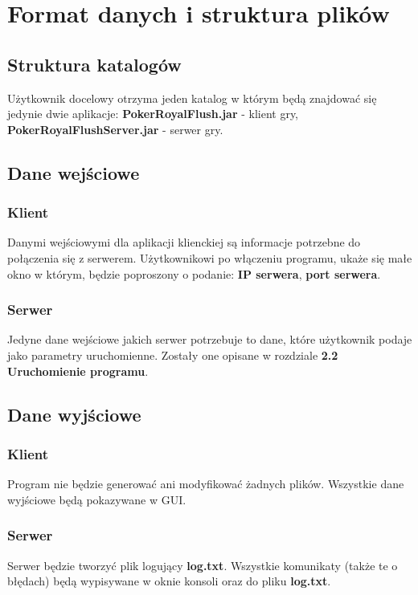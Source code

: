 \documentclass{article}
\begin{document}
\section{Format danych i struktura plików}
    \subsection{Struktura katalogów}
        Użytkownik docelowy otrzyma jeden katalog w którym będą znajdować się jedynie dwie aplikacje: \textbf{PokerRoyalFlush.jar} - klient gry, \textbf{PokerRoyalFlushServer.jar} - serwer gry.
    
    \subsection{Dane wejściowe}
        \subsubsection{Klient}
            Danymi wejściowymi dla aplikacji klienckiej są informacje potrzebne do połączenia się z serwerem.
            Użytkownikowi po włączeniu programu, ukaże się małe okno w którym, będzie poproszony o podanie: \textbf{IP serwera}, \textbf{port serwera}.
        
        \subsubsection{Serwer}
            Jedyne dane wejściowe jakich serwer potrzebuje to dane, które użytkownik podaje jako parametry uruchomienne. Zostały one opisane w rozdziale \textbf{2.2 Uruchomienie programu}.
    
    \subsection{Dane wyjściowe}
        \subsubsection{Klient}
            Program nie będzie generować ani modyfikować żadnych plików. Wszystkie dane wyjściowe będą pokazywane w GUI.
        
        \subsubsection{Serwer}
            Serwer będzie tworzyć plik logujący \textbf{log.txt}. Wszystkie komunikaty (także te o błędach) będą wypisywane w oknie konsoli oraz do pliku \textbf{log.txt}.
\end{document}
